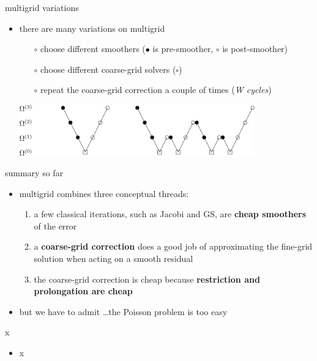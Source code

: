 \documentclass[10pt,
               svgnames,
               hyperref={colorlinks,citecolor=DeepPink4,linkcolor=FireBrick,urlcolor=Maroon},
               usepdftitle=false]{beamer}
\begin{document}
\begin{frame}{multigrid variations}
\begin{itemize}
\item there are many variations on multigrid
	\begin{itemize}
	\item[$\circ$] choose different smoothers ({\large $\bullet$} is pre-smoother, {\large $\circ$} is post-smoother)
	\item[$\circ$] choose different coarse-grid solvers ($\square$)
	\item[$\circ$] repeat the coarse-grid correction a couple of times (\emph{W cycles})
	\end{itemize}

\bigskip\bigskip
\hfill \includegraphics[width=0.8\textwidth]{images/multigrid-cycles.png}
\end{itemize}
\end{frame}


\begin{frame}{summary so far}
\begin{itemize}
\item multigrid combines three conceptual threads:
\begin{enumerate}
\item a few classical iterations, such as Jacobi and GS, are \textbf{cheap smoothers} of the error
\item a \textbf{coarse-grid correction} does a good job of approximating the fine-grid solution when acting on a smooth residual
\item the coarse-grid correction is cheap because \textbf{restriction and prolongation are cheap}
\end{enumerate}

\bigskip
\item<2> but we have to admit \dots the Poisson problem is too easy
\end{itemize}
\end{frame}






\begin{frame}{x}
\begin{itemize}
\item x
\end{itemize}
\end{frame}
\end{document}
